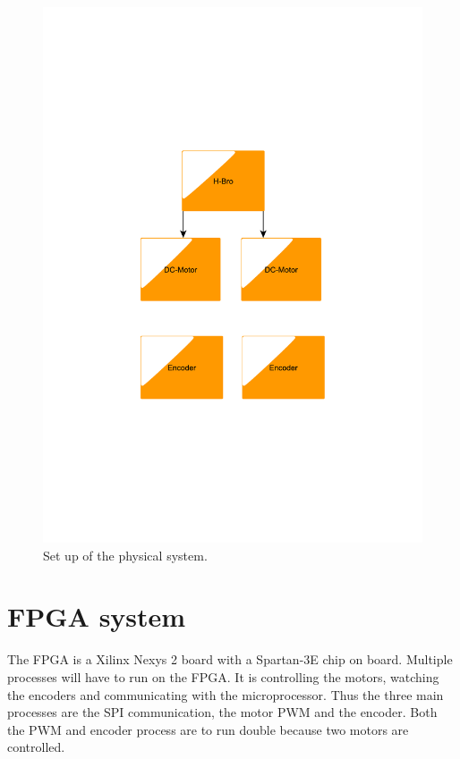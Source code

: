 \begin{figure}[htb]
	\centering
	\includegraphics[scale=0.4,trim=200 200 200 200]{graphics/phsycicalsystem} %
	\caption{Set up of the physical system.}
	\label{fig:phsysicalsystem}			%
\end{figure}

\section{FPGA system}\label{sec:FPGA}

The FPGA is a Xilinx Nexys 2 board with a Spartan-3E chip on board. Multiple processes will have to run on the FPGA. It is controlling the motors, watching the encoders and communicating with the microprocessor. Thus the three main processes are the SPI communication, the motor PWM and the encoder. Both the PWM and encoder process are to run double because two motors are controlled. 

